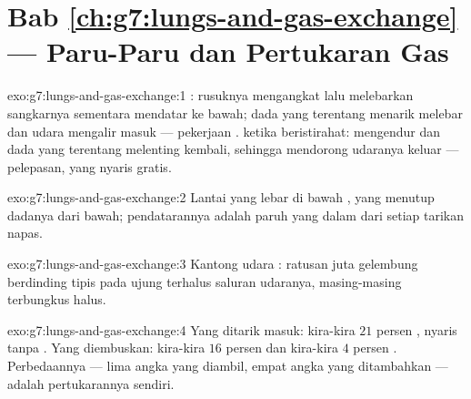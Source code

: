 \section*{Bab \ref{ch:g7:lungs-and-gas-exchange} --- Paru-Paru dan Pertukaran Gas}

\begin{solution}{exo:g7:lungs-and-gas-exchange:1}
:  rusuknya mengangkat lalu melebarkan sangkarnya
sementara  mendatar ke bawah; dada yang terentang menarik
 melebar dan udara mengalir masuk --- pekerjaan .
 ketika beristirahat:  mengendur dan dada
yang terentang melenting kembali, sehingga mendorong udaranya keluar
--- pelepasan, yang nyaris gratis.
\end{solution}

\begin{solution}{exo:g7:lungs-and-gas-exchange:2}
Lantai  yang lebar di bawah , yang menutup dadanya dari
bawah; pendatarannya adalah paruh yang dalam dari setiap tarikan napas.
\end{solution}

\begin{solution}{exo:g7:lungs-and-gas-exchange:3}
Kantong udara : ratusan juta gelembung berdinding tipis
pada ujung terhalus saluran udaranya, masing-masing terbungkus
 halus.
\end{solution}

\begin{solution}{exo:g7:lungs-and-gas-exchange:4}
Yang ditarik masuk: kira-kira $21$ persen , nyaris tanpa . Yang diembuskan: kira-kira $16$ persen  dan kira-kira
$4$ persen . Perbedaannya --- lima angka  yang
diambil, empat angka  yang ditambahkan --- adalah
pertukarannya sendiri.
\end{solution}

